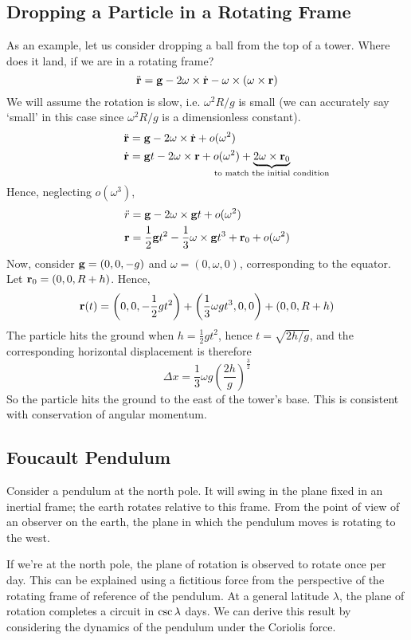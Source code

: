 \documentclass{article}
\begin{document}
\subsection{Dropping a Particle in a Rotating Frame}
As an example, let us consider dropping a ball from the top of a tower. Where does it land, if we are in a rotating frame?
\[ \ddot{\vb r} = \vb g - 2\vb\omega \times \dot{\vb r} - \vb\omega \times (\vb\omega \times \vb r) \]
We will assume the rotation is slow, i.e. $\omega^2 R / g$ is small (we can accurately say `small' in this case since $\omega^2R/g$ is a dimensionless constant).
\begin{align*}
    \rddot & = \vb g - 2\omega \times \rdot + o(\omega^2)                                                                                          \\
    \rdot  & = \vb gt - 2\omega \times \vb r + o(\omega^2) + \underbrace{2\omega\times \vb r_0}_{\mathclap{\text{to match the initial condition}}}
\end{align*}
Hence, neglecting $o(\omega^3)$,
\begin{align*}
    \ddot r & = \vb g - 2\omega \times \vb gt + o(\omega^2)                                       \\
    \vb r   & = \frac{1}{2}\vb gt^2 - \frac{1}{3}\vb\omega\times \vb gt^3 + \vb r_0 + o(\omega^2)
\end{align*}
Now, consider $\vb g = (0, 0, -g)$ and $\omega = (0, \omega, 0)$, corresponding to the equator. Let $\vb r_0 = (0, 0, R + h)$. Hence,
\[ \vb r(t) = \qty(0, 0, -\frac{1}{2}gt^2) + \qty(\frac{1}{3}\omega g t^3, 0, 0) + (0, 0, R + h) \]
The particle hits the ground when $h = \frac{1}{2}gt^2$, hence $t = \sqrt{2h/g}$, and the corresponding horizontal displacement is therefore
\[ \Delta x = \frac{1}{3}\omega g \left( \frac{2h}{g} \right)^{\frac{3}{2}} \]
So the particle hits the ground to the east of the tower's base. This is consistent with conservation of angular momentum.

\subsection{Foucault Pendulum}
Consider a pendulum at the north pole. It will swing in the plane fixed in an inertial frame; the earth rotates relative to this frame. From the point of view of an observer on the earth, the plane in which the pendulum moves is rotating to the west.

If we're at the north pole, the plane of rotation is observed to rotate once per day. This can be explained using a fictitious force from the perspective of the rotating frame of reference of the pendulum. At a general latitude $\lambda$, the plane of rotation completes a circuit in $\cosecant\lambda$ days. We can derive this result by considering the dynamics of the pendulum under the Coriolis force.
\end{document}
